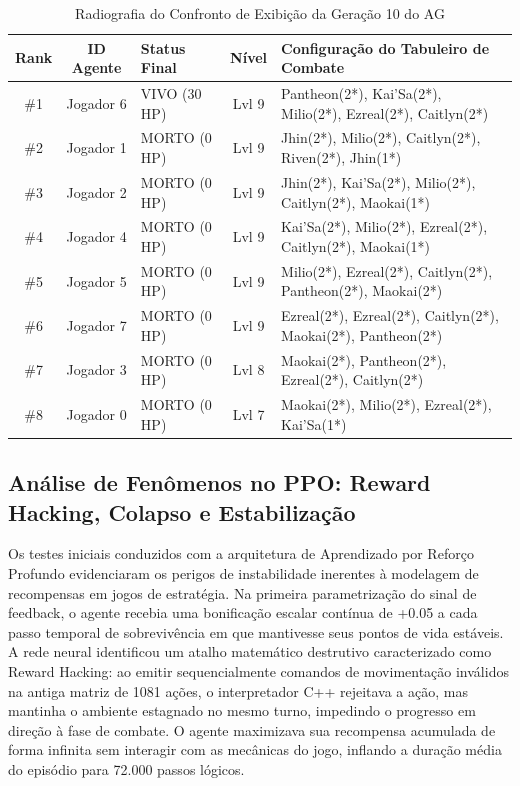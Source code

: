 \documentclass[12pt]{article}
\begin{document}
\begin{table}[h]
\centering
\caption{Radiografia do Confronto de Exibição da Geração 10 do AG}
\label{tab:radiografia}
\begin{tabular}{cclcl}
\hline
\textbf{Rank} & \textbf{ID Agente} & \textbf{Status Final} & \textbf{Nível} & \textbf{Configuração do Tabuleiro de Combate} \\ \hline
\#1 & Jogador 6 & VIVO (30 HP) & Lvl 9 & Pantheon(2*), Kai'Sa(2*), Milio(2*), Ezreal(2*), Caitlyn(2*) \\
\#2 & Jogador 1 & MORTO (0 HP) & Lvl 9 & Jhin(2*), Milio(2*), Caitlyn(2*), Riven(2*), Jhin(1*) \\
\#3 & Jogador 2 & MORTO (0 HP) & Lvl 9 & Jhin(2*), Kai'Sa(2*), Milio(2*), Caitlyn(2*), Maokai(1*) \\
\#4 & Jogador 4 & MORTO (0 HP) & Lvl 9 & Kai'Sa(2*), Milio(2*), Ezreal(2*), Caitlyn(2*), Maokai(1*) \\
\#5 & Jogador 5 & MORTO (0 HP) & Lvl 9 & Milio(2*), Ezreal(2*), Caitlyn(2*), Pantheon(2*), Maokai(2*) \\
\#6 & Jogador 7 & MORTO (0 HP) & Lvl 9 & Ezreal(2*), Ezreal(2*), Caitlyn(2*), Maokai(2*), Pantheon(2*) \\
\#7 & Jogador 3 & MORTO (0 HP) & Lvl 8 & Maokai(2*), Pantheon(2*), Ezreal(2*), Caitlyn(2*) \\
\#8 & Jogador 0 & MORTO (0 HP) & Lvl 7 & Maokai(2*), Milio(2*), Ezreal(2*), Kai'Sa(1*) \\ \hline
\end{tabular}
\end{table}

\subsection{Análise de Fenômenos no PPO: Reward Hacking, Colapso e Estabilização}
Os testes iniciais conduzidos com a arquitetura de Aprendizado por Reforço Profundo evidenciaram os perigos de instabilidade inerentes à modelagem de recompensas em jogos de estratégia. Na primeira parametrização do sinal de feedback, o agente recebia uma bonificação escalar contínua de +0.05 a cada passo temporal de sobrevivência em que mantivesse seus pontos de vida estáveis. A rede neural identificou um atalho matemático destrutivo caracterizado como Reward Hacking: ao emitir sequencialmente comandos de movimentação inválidos na antiga matriz de 1081 ações, o interpretador C++ rejeitava a ação, mas mantinha o ambiente estagnado no mesmo turno, impedindo o progresso em direção à fase de combate. O agente maximizava sua recompensa acumulada de forma infinita sem interagir com as mecânicas do jogo, inflando a duração média do episódio para 72.000 passos lógicos.
\end{document}
